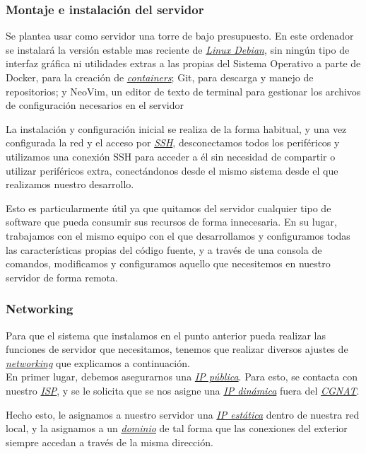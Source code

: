 \documentclass{article}
\begin{document}
\subsubsection{Montaje e instalación del servidor}
Se plantea usar como servidor una torre de bajo presupuesto. En este ordenador se instalará la versión estable mas reciente de \hyperref[sec:terms]{\textit{Linux Debian}\tec}, sin ningún tipo de interfaz gráfica ni utilidades extras a las propias del Sistema Operativo a parte de Docker, para la creación de \hyperref[sec:terms]{\textit{containers}\tec}; Git, para descarga y manejo de repositorios; y NeoVim, un editor de texto de terminal para gestionar los archivos de configuración necesarios en el servidor

La instalación y configuración inicial se realiza de la forma habitual, y una vez configurada la red y el acceso por \hyperref[sec:terms]{\textit{SSH}\tec}, desconectamos todos los periféricos y utilizamos una conexión SSH para acceder a él sin necesidad de compartir o utilizar periféricos extra, conectándonos desde el mismo sistema desde el que realizamos nuestro desarrollo.

Esto es particularmente útil ya que quitamos del servidor cualquier tipo de software que pueda consumir sus recursos de forma innecesaria. En su lugar, trabajamos con el mismo equipo con el que desarrollamos y configuramos todas las características propias del código fuente, y a través de una consola de comandos, modificamos y configuramos aquello que necesitemos en nuestro servidor de forma remota.

\subsubsection{Networking}
Para que el sistema que instalamos en el punto anterior pueda realizar las funciones de servidor que necesitamos, tenemos que realizar diversos ajustes de \hyperref[sec:terms]{\textit{networking}\tec} que explicamos a continuación.\\

En primer lugar, debemos asegurarnos una \hyperref[sec:terms]{\textit{IP pública}\tec}. Para esto, se contacta con nuestro \hyperref[sec:terms]{\textit{ISP}\tec}, y se le solicita que se nos asigne una \hyperref[sec:terms]{\textit{IP dinámica}\tec} fuera del \hyperref[sec:terms]{\textit{CGNAT}\tec}.

Hecho esto, le asignamos a nuestro servidor una \hyperref[sec:terms]{\textit{IP estática}\tec} dentro de nuestra red local, y la asignamos a un \hyperref[sec:terms]{\textit{dominio}\tec} de tal forma que las conexiones del exterior siempre accedan a través de la misma dirección.
\end{document}
